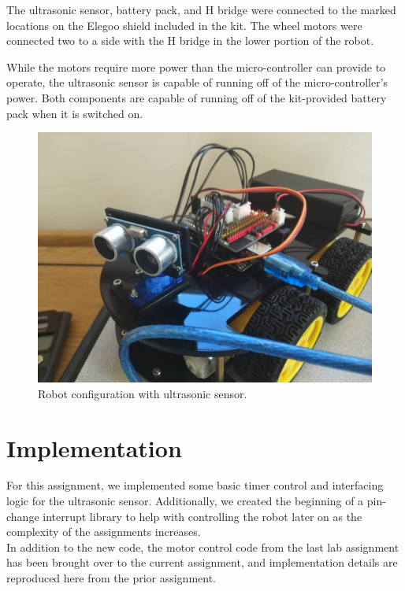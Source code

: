 \documentclass[letterpaper,11pt]{texMemo} %
\begin{document}
The ultrasonic sensor, battery pack, and H bridge were connected to the marked locations on the Elegoo shield included in the kit. The wheel motors were connected two to a side with the H bridge in the lower portion of the robot.

While the motors require more power than the micro-controller can provide to operate, the ultrasonic sensor is capable of running off of the micro-controller's power. Both components are capable of running off of the kit-provided battery pack when it is switched on.

\begin{figure}[!ht]
\begin{center}
\includegraphics[width=\linewidth]{robot.jpg}
\end{center}
\caption{Robot configuration with ultrasonic sensor.}
\label{fig:f4}
\end{figure}

\section*{Implementation}
For this assignment, we implemented some basic timer control and interfacing logic for the ultrasonic sensor. Additionally, we created the beginning of a pin-change interrupt library to help with controlling the robot later on as the complexity of the assignments increases.\\

In addition to the new code, the motor control code from the last lab assignment has been brought over to the current assignment, and implementation details are reproduced here from the prior assignment.
\end{document}
